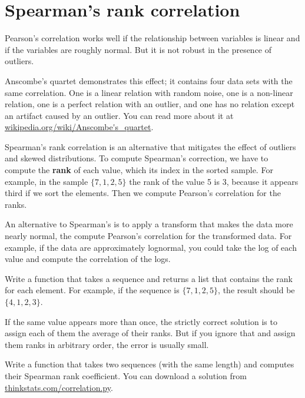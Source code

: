 \documentclass[12pt]{book}
\begin{document}
\section{Spearman's rank correlation}

Pearson's correlation works well if the relationship between variables
is linear and if the variables are roughly normal.  But it is not
robust in the presence of outliers.


Anscombe's quartet demonstrates this effect; it contains four data
sets with the same correlation.  One is a linear relation with random
noise, one is a non-linear relation, one is a perfect relation with an
outlier, and one has no relation except an artifact caused by an
outlier.  You can read more about it at
\url{wikipedia.org/wiki/Anscombe's_quartet}.

Spearman's rank correlation is an alternative that mitigates the
effect of outliers and skewed distributions.  To compute Spearman's
correction, we have to compute the {\bf rank} of each value, which its
index in the sorted sample.  For example, in the sample $\{ 7, 1, 2, 5
\}$ the rank of the value 5 is 3, because it appears third if we sort
the elements.  Then we compute Pearson's correlation for the ranks.

An alternative to Spearman's is to apply a transform that makes the
data more nearly normal, the compute Pearson's correlation for the
transformed data.  For example, if the data are approximately
lognormal, you could take the log of each value and compute the
correlation of the logs.


\begin{ex}

Write a function that takes a sequence and returns a list that
contains the rank for each element.  For example, if the sequence is
$\{ 7, 1, 2, 5 \}$, the result should be $\{ 4, 1, 2, 3 \}$.

If the same value appears more than once, the strictly correct
solution is to assign each of them the average of their ranks.  But if
you ignore that and assign them ranks in arbitrary order, the error is
usually small.

Write a function that takes two sequences (with the same length) and
computes their Spearman rank coefficient.  You can download a solution
from \url{thinkstats.com/correlation.py}.


\end{ex}
\end{document}

